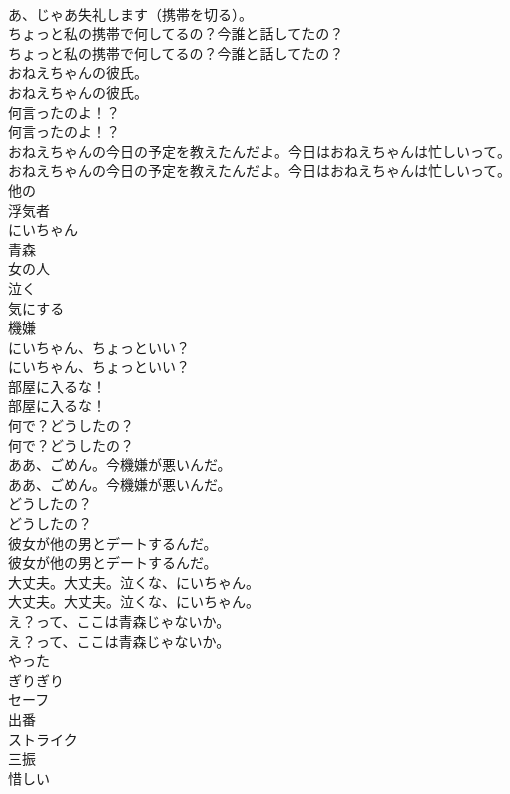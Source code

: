 \documentclass[8pt]{extreport}
\begin{document}
\begin{CJK}{UTF8}{min}
\\	あ、じゃあ失礼します（携帯を切る）。 
\\	ちょっと私の携帯で何してるの？今誰と話してたの？	
\\	ちょっと私の携帯で何してるの？今誰と話してたの？ 
\\	おねえちゃんの彼氏。	
\\	おねえちゃんの彼氏。 
\\	何言ったのよ！？	
\\	何言ったのよ！？ 
\\	おねえちゃんの今日の予定を教えたんだよ。今日はおねえちゃんは忙しいって。	
\\	おねえちゃんの今日の予定を教えたんだよ。今日はおねえちゃんは忙しいって。 
\\	他の
\\	浮気者
\\	にいちゃん
\\	青森
\\	女の人
\\	泣く
\\	気にする
\\	機嫌
\\	にいちゃん、ちょっといい？	
\\	にいちゃん、ちょっといい？ 
\\	部屋に入るな！	
\\	部屋に入るな！ 
\\	何で？どうしたの？	
\\	何で？どうしたの？ 
\\	ああ、ごめん。今機嫌が悪いんだ。	
\\	ああ、ごめん。今機嫌が悪いんだ。 
\\	どうしたの？	
\\	どうしたの？ 
\\	彼女が他の男とデートするんだ。	
\\	彼女が他の男とデートするんだ。 
\\	大丈夫。大丈夫。泣くな、にいちゃん。	
\\	大丈夫。大丈夫。泣くな、にいちゃん。 
\\	え？って、ここは青森じゃないか。	
\\	え？って、ここは青森じゃないか。 
\\	やった
\\	ぎりぎり
\\	セーフ
\\	出番
\\	ストライク
\\	三振
\\	惜しい

\end{CJK}
\end{document}
